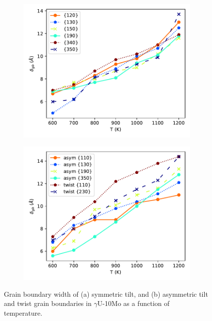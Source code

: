 \documentclass{elsarticle}
\providecommand{\DIFadd}[1]{{\protect\color{blue} \sf #1}} %
\providecommand{\DIFdel}[1]{}
\providecommand{\DIFaddFL}[1]{\DIFadd{#1}} %
\providecommand{\DIFdelFL}[1]{\DIFdel{#1}} %
\providecommand{\DIFaddbeginFL}{} %
\providecommand{\DIFaddendFL}{} %
\providecommand{\DIFdelbeginFL}{} %
\providecommand{\DIFdelendFL}{} %
\begin{document}
\begin{figure}[!ht]
\DIFaddbeginFL \begin{subfigure}{0.49\textwidth}
	\DIFaddendFL \centering
	\DIFdelbeginFL %
\DIFdelendFL \caption{\DIFdelbeginFL \DIFdelFL{Number of grain boundary atoms as a function of temperature for symmetric tilt \{120\} in $\gamma$U-10Mo.}\DIFdelendFL }
	\DIFdelbeginFL %
\DIFdelendFL \DIFaddbeginFL \includegraphics[width=\textwidth]{d_gb_sym.pdf}
\end{subfigure}
\begin{subfigure}{0.49\textwidth}
	\centering
	\caption{}
	\includegraphics[width=\textwidth]{d_gb_asym_twist.pdf}
\end{subfigure}
\caption{\DIFaddFL{Grain boundary width of (a) symmetric tilt, and (b) asymmetric tilt and twist grain boundaries in $\gamma$U-10Mo as a function of temperature.}}
\label{fig:delta}
\DIFaddendFL \end{figure}
\end{document}
